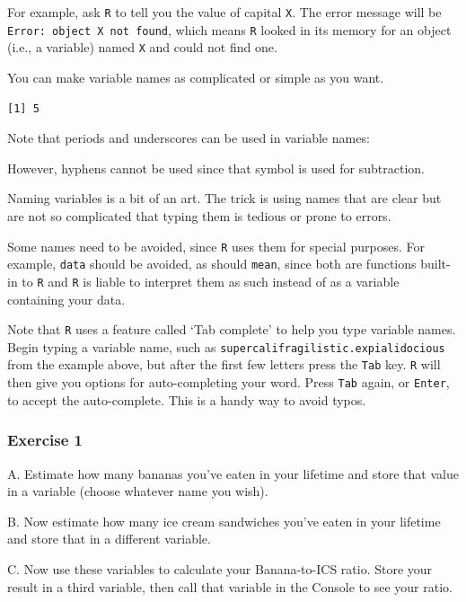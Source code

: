 \documentclass[
]{book}
\begin{document}
For example, ask \texttt{R} to tell you the value of capital \texttt{X}. The error message will be \texttt{Error:\ object\ \textquotesingle{}X\textquotesingle{}\ not\ found}, which means \texttt{R} looked in its memory for an object (i.e., a variable) named \texttt{X} and could not find one.

You can make variable names as complicated or simple as you want.

\begin{verbatim}
[1] 5
\end{verbatim}

Note that periods and underscores can be used in variable names:

However, hyphens cannot be used since that symbol is used for subtraction.

Naming variables is a bit of an art. The trick is using names that are clear but are not so complicated that typing them is tedious or prone to errors.

Some names need to be avoided, since \texttt{R} uses them for special purposes. For example, \texttt{data} should be avoided, as should \texttt{mean}, since both are functions built-in to \texttt{R} and \texttt{R} is liable to interpret them as such instead of as a variable containing your data.

Note that \texttt{R} uses a feature called `Tab complete' to help you type variable names. Begin typing a variable name, such as \texttt{supercalifragilistic.expialidocious} from the example above, but after the first few letters press the \texttt{Tab} key. \texttt{R} will then give you options for auto-completing your word. Press \texttt{Tab} again, or \texttt{Enter}, to accept the auto-complete. This is a handy way to avoid typos.

\hypertarget{exercise-1-1}{%
\subsubsection*{Exercise 1}\label{exercise-1-1}}

A. Estimate how many bananas you've eaten in your lifetime and store that value in a variable (choose whatever name you wish).

B. Now estimate how many ice cream sandwiches you've eaten in your lifetime and store that in a different variable.

C. Now use these variables to calculate your Banana-to-ICS ratio. Store your result in a third variable, then call that variable in the Console to see your ratio.
\end{document}
